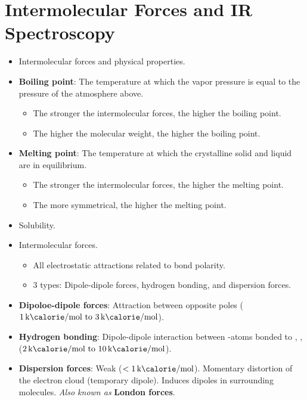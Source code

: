 \documentclass[../notes.tex]{subfiles}
\begin{document}
\section{Intermolecular Forces and IR Spectroscopy}
\begin{itemize}
    \item {}Intermolecular forces and physical properties.
    \item \textbf{Boiling point}: The temperature at which the vapor pressure is equal to the pressure of the atmosphere above.
    \begin{itemize}
        \item The stronger the intermolecular forces, the higher the boiling point.
        \item The higher the molecular weight, the higher the boiling point.
    \end{itemize}
    \item \textbf{Melting point}: The temperature at which the crystalline solid and liquid are in equilibrium.
    \begin{itemize}
        \item The stronger the intermolecular forces, the higher the melting point.
        \item The more symmetrical, the higher the melting point.
    \end{itemize}
    \item Solubility.
    \item Intermolecular forces.
    \begin{itemize}
        \item All electrostatic attractions related to bond polarity.
        \item 3 types: Dipole-dipole forces, hydrogen bonding, and dispersion forces.
    \end{itemize}
    \item \textbf{Dipoloe-dipole forces}: Attraction between opposite poles ($\SIrange[per-mode=symbol]{1}{3}{\kilo\calorie\per\mole}$).
    \item \textbf{Hydrogen bonding}: Dipole-dipole interaction between -atoms bonded to , ,  ($\SIrange[per-mode=symbol]{2}{10}{\kilo\calorie\per\mole}$).
    \item \textbf{Dispersion forces}: Weak ($<\SI[per-mode=symbol]{1}{\kilo\calorie\per\mole}$). Momentary distortion of the electron cloud (temporary dipole). Induces dipoles in surrounding molecules. \emph{Also known as} \textbf{London forces}.
    \begin{itemize}

\end{itemize}
\end{itemize}
\end{document}

